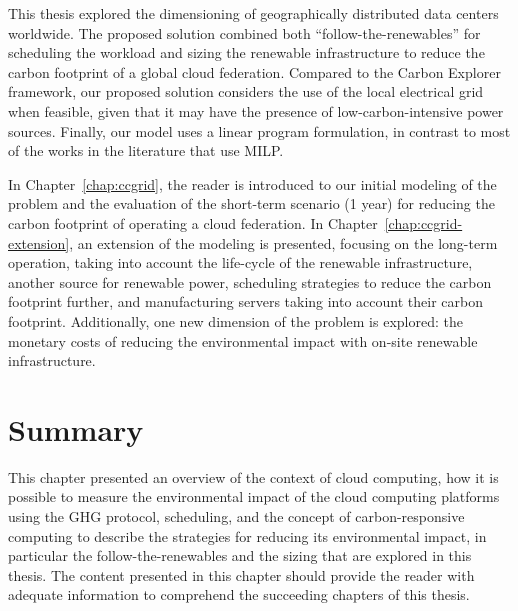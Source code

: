 This thesis explored the dimensioning of geographically distributed data centers worldwide. The proposed solution combined both ``follow-the-renewables'' for scheduling the workload and sizing the renewable infrastructure to reduce the carbon footprint of a global cloud federation. Compared to the Carbon Explorer framework, our proposed solution considers the use of the local electrical grid when feasible, given that it may have the presence of low-carbon-intensive power sources. Finally, our model uses a linear program formulation, in contrast to most of the works in the literature that use MILP.

In Chapter~\ref{chap:ccgrid}, the reader is introduced to our initial modeling of the problem and the evaluation of the short-term scenario (1 year) for reducing the carbon footprint of operating a cloud federation. In Chapter~\ref{chap:ccgrid-extension}, an extension of the modeling is presented, focusing on the long-term operation, taking into account the life-cycle of the renewable infrastructure, another source for renewable power, scheduling strategies to reduce the carbon footprint further, and manufacturing servers taking into account their carbon footprint. Additionally,  one new dimension of the problem is explored: the monetary costs of reducing the environmental impact with on-site renewable infrastructure.




\section{Summary}
\label{sec:summary_background}
This chapter presented an overview of the context of cloud computing, how it is possible to measure the environmental impact of the cloud computing platforms using the GHG protocol, scheduling, and the concept of carbon-responsive computing to describe the strategies for reducing its environmental impact, in particular the follow-the-renewables and the sizing that are explored in this thesis. The content presented in this chapter should provide the reader with adequate information to comprehend the succeeding chapters of this thesis.
